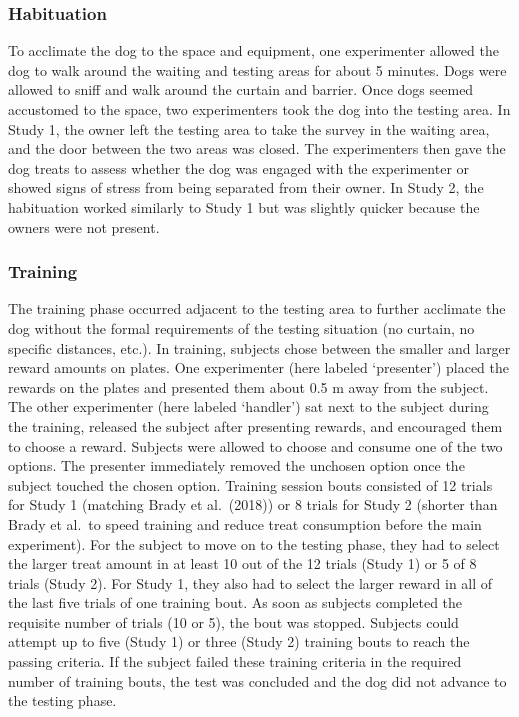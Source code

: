 \documentclass[
  pub,floatsintext]{apa6}
\begin{document}
\hypertarget{habituation}{%
\subsubsection{Habituation}\label{habituation}}

To acclimate the dog to the space and equipment, one experimenter allowed the dog to walk around the waiting and testing areas for about 5 minutes. Dogs were allowed to sniff and walk around the curtain and barrier. Once dogs seemed accustomed to the space, two experimenters took the dog into the testing area. In Study 1, the owner left the testing area to take the survey in the waiting area, and the door between the two areas was closed. The experimenters then gave the dog treats to assess whether the dog was engaged with the experimenter or showed signs of stress from being separated from their owner. In Study 2, the habituation worked similarly to Study 1 but was slightly quicker because the owners were not present.

\hypertarget{training}{%
\subsubsection{Training}\label{training}}

The training phase occurred adjacent to the testing area to further acclimate the dog without the formal requirements of the testing situation (no curtain, no specific distances, etc.). In training, subjects chose between the smaller and larger reward amounts on plates. One experimenter (here labeled `presenter') placed the rewards on the plates and presented them about 0.5 m away from the subject. The other experimenter (here labeled `handler') sat next to the subject during the training, released the subject after presenting rewards, and encouraged them to choose a reward. Subjects were allowed to choose and consume one of the two options. The presenter immediately removed the unchosen option once the subject touched the chosen option. Training session bouts consisted of 12 trials for Study 1 (matching Brady et al.~(2018)) or 8 trials for Study 2 (shorter than Brady et al.~to speed training and reduce treat consumption before the main experiment). For the subject to move on to the testing phase, they had to select the larger treat amount in at least 10 out of the 12 trials (Study 1) or 5 of 8 trials (Study 2). For Study 1, they also had to select the larger reward in all of the last five trials of one training bout. As soon as subjects completed the requisite number of trials (10 or 5), the bout was stopped. Subjects could attempt up to five (Study 1) or three (Study 2) training bouts to reach the passing criteria. If the subject failed these training criteria in the required number of training bouts, the test was concluded and the dog did not advance to the testing phase.
\end{document}
